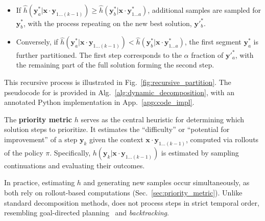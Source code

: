 

\begin{itemize}[leftmargin=*,itemsep=0pt,topsep=0pt,parsep=0pt, partopsep=0pt]
    \item If $\hat{h}(\boldsymbol{y}^*_a | \boldsymbol{x} \cdot \boldsymbol{y}_{1...(k-1)}) \ge \hat{h}(\boldsymbol{y}^*_b | \boldsymbol{x} \cdot \boldsymbol{y}^*_{1...a})$, additional samples are sampled for $\boldsymbol{y}^*_b$, with the process repeating on the new best solution, $\boldsymbol{y}'^*_b$.
    \item Conversely, if $\hat{h}(\boldsymbol{y}^*_a | \boldsymbol{x}\cdot \boldsymbol{y}_{1...(k-1)}) < \hat{h}(\boldsymbol{y}^*_b | \boldsymbol{x} \cdot \boldsymbol{y}^*_{1...a})$, the first segment $\boldsymbol{y}^*_a$ is further partitioned. The first step corresponds to the $\alpha$ fraction of $\boldsymbol{y}'^*_a$, with the remaining part of the full solution forming the second step.
\end{itemize}



This recursive process is illustrated in Fig.~\ref{fig:recursive_partition}. The pseudocode for \decomp is provided in Alg.~\ref{alg:dynamic_decomposition}, with an annotated Python implementation in App.~\ref{app:code_impl}. 



The \textbf{priority metric} $h$ serves as the central heuristic for determining which solution steps to prioritize. It estimates the ``difficulty'' or ``potential for improvement'' of a step $\boldsymbol{y}_k$ given the context $\boldsymbol{x} \cdot \boldsymbol{y}_{1...(k-1)}$, computed via rollouts of the policy $\pi$. Specifically, $h(\boldsymbol{y}_k| \boldsymbol{x} \cdot \boldsymbol{y}_{1...(k-1)})$ is estimated by sampling continuations and evaluating their outcomes.

In practice, estimating $h$ and generating new samples occur simultaneously, as both rely on rollout-based computations (Sec.~\ref{sec:priority_metric}). Unlike standard decomposition methods, \decomp does not process steps in strict temporal order, resembling goal-directed planning~\citep{parascandolo2020divide} and \emph{backtracking}. 



